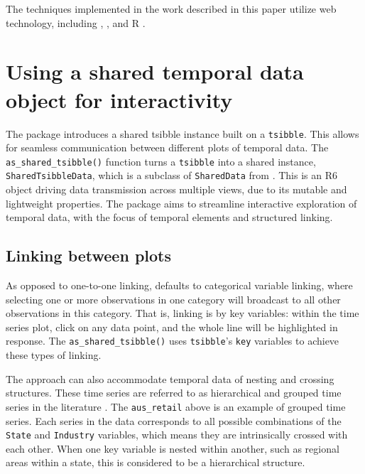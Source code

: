 The techniques implemented in the work described in this paper utilize
web technology, including , , and R
.

\hypertarget{using-a-shared-temporal-data-object-for-interactivity}{%
\section{Using a shared temporal data object for
interactivity}\label{using-a-shared-temporal-data-object-for-interactivity}}

The  package introduces a shared tsibble instance
built on a \texttt{tsibble}. This allows for seamless communication
between different plots of temporal data. The
\texttt{as\_shared\_tsibble()} function turns a \texttt{tsibble} into a
shared instance, \texttt{SharedTsibbleData}, which is a subclass of
\texttt{SharedData} from . This is an R6 object
driving data transmission across multiple views, due to its mutable and
lightweight properties. The  package aims to
streamline interactive exploration of temporal data, with the focus of
temporal elements and structured linking.

\hypertarget{linking-between-plots}{%
\subsection{Linking between plots}\label{linking-between-plots}}

As opposed to one-to-one linking,  defaults to
categorical variable linking, where selecting one or more observations
in one category will broadcast to all other observations in this
category. That is, linking is by key variables: within the time series
plot, click on any data point, and the whole line will be highlighted in
response. The \texttt{as\_shared\_tsibble()} uses \texttt{tsibble}'s
\texttt{key} variables to achieve these types of linking.

The approach can also accommodate temporal data of nesting and crossing
structures. These time series are referred to as hierarchical and
grouped time series in the literature \citep{fpp}. The
\texttt{aus\_retail} above is an example of grouped time series. Each
series in the data corresponds to all possible combinations of the
\texttt{State} and \texttt{Industry} variables, which means they are
intrinsically crossed with each other. When one key variable is nested
within another, such as regional areas within a state, this is
considered to be a hierarchical structure.


